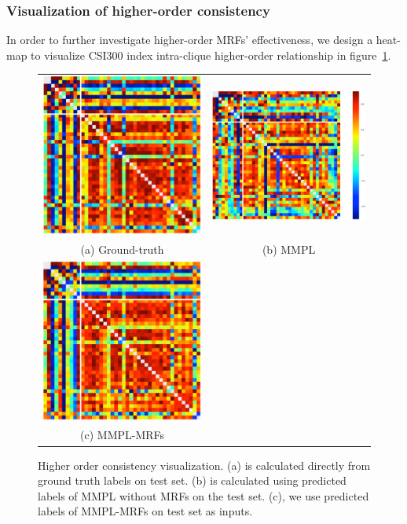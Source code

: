 \subsubsection{Visualization of higher-order consistency}

In order to further investigate higher-order MRFs' effectiveness,
we design a heat-map to visualize CSI300 index intra-clique
higher-order relationship in figure~\ref{fig:consistency}.

\begin{figure}[t]
  \centering
  \setlength{\tabcolsep}{20pt}
  \begin{tabular}{cc}
  \includegraphics[width=0.4\columnwidth]{Methodology/figures/gt.png}&
\includegraphics[width=0.48\columnwidth]{Methodology/figures/mmpl.png}\\
{\small (a) Ground-truth} & {\small (b) MMPL }\\
    \includegraphics[width=0.4\columnwidth]{Methodology/figures/mrf.png}\\
{\small (c) MMPL-MRFs}\\
  \end{tabular}
  \caption{\label{fig:consistency} Higher order consistency
    visualization. (a) is calculated
    directly from ground truth labels on test set.
    (b)
    is calculated using predicted labels of MMPL without MRFs on the
    test set.
    (c), we use predicted labels of
    MMPL-MRFs on test set as inputs.}
\end{figure}

